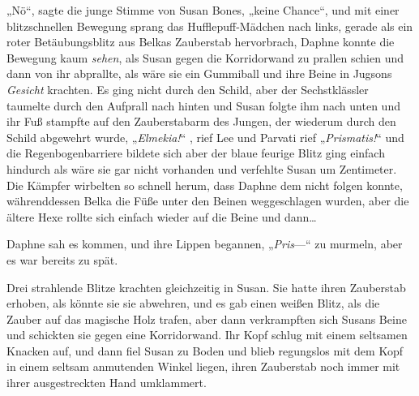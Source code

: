 „Nö“, sagte die junge Stimme von Susan Bones, „keine Chance“, und mit einer blitzschnellen Bewegung sprang das Hufflepuff-Mädchen nach links, gerade als ein roter Betäubungsblitz aus Belkas Zauberstab hervorbrach, Daphne konnte die Bewegung kaum \emph{sehen}, als Susan gegen die Korridorwand zu prallen schien und dann von ihr abprallte, als wäre sie ein Gummiball und ihre Beine in Jugsons \emph{Gesicht} krachten. Es ging nicht durch den Schild, aber der Sechstklässler taumelte durch den Aufprall nach hinten und Susan folgte ihm nach unten und ihr Fuß stampfte auf den Zauberstabarm des Jungen, der wiederum durch den Schild abgewehrt wurde, „\emph{Elmekia!}“ , rief Lee und Parvati rief „\emph{Prismatis!}“ und die Regenbogenbarriere bildete sich aber der blaue feurige Blitz ging einfach hindurch als wäre sie gar nicht vorhanden und verfehlte Susan um Zentimeter. Die Kämpfer wirbelten so schnell herum, dass Daphne dem nicht folgen konnte, währenddessen Belka die Füße unter den Beinen weggeschlagen wurden, aber die ältere Hexe rollte sich einfach wieder auf die Beine und dann…

Daphne sah es kommen, und ihre Lippen begannen, „\emph{Pris}—“ zu murmeln, aber es war bereits zu spät.

Drei strahlende Blitze krachten gleichzeitig in Susan. Sie hatte ihren Zauberstab erhoben, als könnte sie sie abwehren, und es gab einen weißen Blitz, als die Zauber auf das magische Holz trafen, aber dann verkrampften sich Susans Beine und schickten sie gegen eine Korridorwand. Ihr Kopf schlug mit einem seltsamen Knacken auf, und dann fiel Susan zu Boden und blieb regungslos mit dem Kopf in einem seltsam anmutenden Winkel liegen, ihren Zauberstab noch immer mit ihrer ausgestreckten Hand umklammert.


